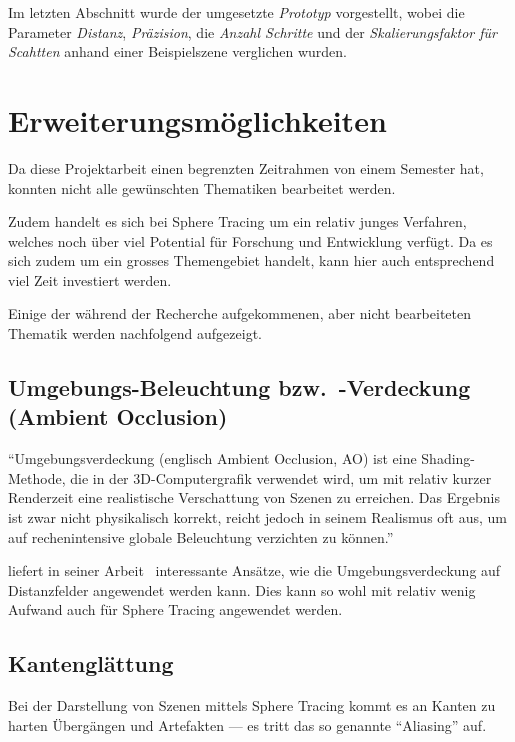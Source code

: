 Im letzten Abschnitt wurde der umgesetzte \textit{Prototyp} vorgestellt,
wobei die Parameter \textit{Distanz}, \textit{Präzision}, die
\textit{Anzahl Schritte} und der \textit{Skalierungsfaktor für Scahtten}
anhand einer Beispielszene verglichen wurden.

\section{Erweiterungsmöglichkeiten}
\label{sec:further_work}

Da diese Projektarbeit einen begrenzten Zeitrahmen von einem Semester
hat, konnten nicht alle gewünschten Thematiken bearbeitet werden.

Zudem handelt es sich bei Sphere Tracing um ein relativ junges
Verfahren, welches noch über viel Potential für Forschung und
Entwicklung verfügt. Da es sich zudem um ein grosses Themengebiet
handelt, kann hier auch entsprechend viel Zeit investiert werden.

Einige der während der Recherche aufgekommenen, aber nicht bearbeiteten
Thematik werden nachfolgend aufgezeigt.

\subsection{Umgebungs-Beleuchtung bzw.\ -Verdeckung (Ambient Occlusion)}
\label{subsec:further_work:ambient_occlusion}

``Umgebungsverdeckung (englisch Ambient Occlusion, AO) ist eine
Shading-Methode, die in der 3D-Computergrafik verwendet wird, um mit
relativ kurzer Renderzeit eine realistische Verschattung von Szenen zu
erreichen. Das Ergebnis ist zwar nicht physikalisch korrekt, reicht
jedoch in seinem Realismus oft aus, um auf rechenintensive globale
Beleuchtung verzichten zu
können.''~\parencite{wikipedia_the_free_encyclopedia_umgebungsverdeckung_2015}

\citeauthor{evans_fast_2006} liefert in seiner
Arbeit~ interessante Ansätze, wie die
Umgebungsverdeckung auf Distanzfelder angewendet werden kann. Dies kann
so wohl mit relativ wenig Aufwand auch für Sphere Tracing angewendet
werden.

\subsection{Kantenglättung}
\label{subsec:further_work:antialiasing}

Bei der Darstellung von Szenen mittels Sphere Tracing kommt es an Kanten
zu harten Übergängen und Artefakten --- es tritt das so genannte
``Aliasing'' auf.

